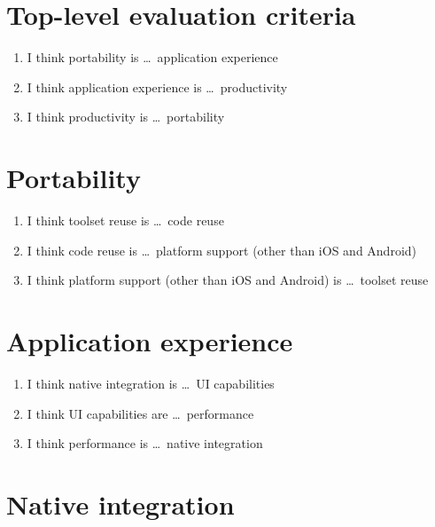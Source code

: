 \section{Top-level evaluation criteria}

\begin{enumerate}
    \item I think portability is \ldots\ application experience
    \ahpscale
    
    \item I think application experience is \ldots\ productivity
    \ahpscale
    
    \item I think productivity is \ldots\ portability
    \ahpscale
\end{enumerate}

\section{Portability}

\begin{enumerate}
    \item I think toolset reuse is \ldots\ code reuse
    \ahpscale
    
    \item I think code reuse is \ldots\ platform support (other than iOS and Android)
    \ahpscale
    
    \item I think platform support (other than iOS and Android) is \ldots\ toolset reuse
    \ahpscale
\end{enumerate}

\newpage
\section{Application experience}

\begin{enumerate}
    \item I think native integration is \ldots\ UI capabilities
    \ahpscale
    
    \item I think UI capabilities are \ldots\ performance
    \ahpscale
    
    \item I think performance is \ldots\ native integration
    \ahpscale
\end{enumerate}

\section{Native integration}

